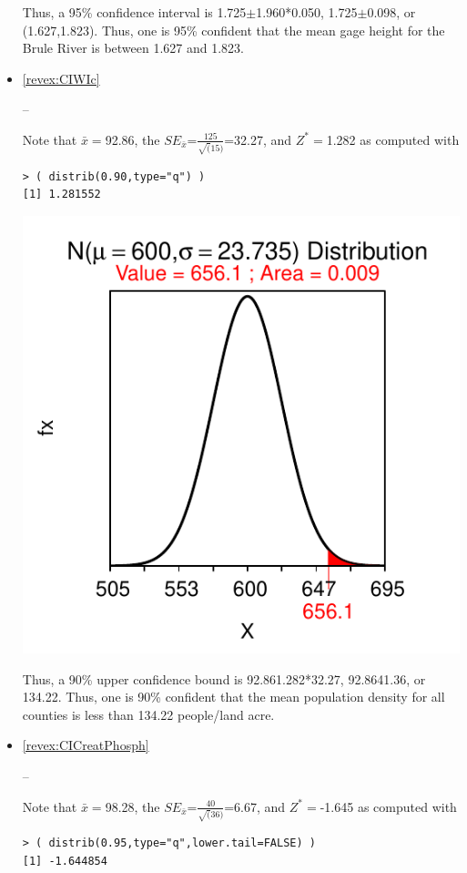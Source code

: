 \documentclass[10pt,openany]{book}\usepackage[]{graphicx}\usepackage[]{color}
\makeatletter
\newenvironment{kframe}{%
 \def\at@end@of@kframe{}%
 \ifinner\ifhmode%
  \def\at@end@of@kframe{\end{minipage}}%
  \begin{minipage}{\columnwidth}%
 \fi\fi%
 \def\FrameCommand##1{\hskip\@totalleftmargin \hskip-\fboxsep
 \colorbox{shadecolor}{##1}\hskip-\fboxsep
     \hskip-\linewidth \hskip-\@totalleftmargin \hskip\columnwidth}%
 \MakeFramed {\advance\hsize-\width
   \@totalleftmargin\z@ \linewidth\hsize
   \@setminipage}}%
 {\par\unskip\endMakeFramed%
 \at@end@of@kframe}
\newenvironment{knitrout}{}{} %
\makeatother
\begin{document}
\begin{itemize}
\begin{knitrout}
{}



\end{knitrout}
Thus, a 95\% confidence interval is 1.725$\pm$1.960*0.050, 1.725$\pm$0.098, or (1.627,1.823).  Thus, one is 95\% confident that the mean gage height for the Brule River is between 1.627 and 1.823.
  \item \hypertarget{ans:CIWIc}{\ref{revex:CIWIc}} --

Note that $\bar{x}=$92.86, the $SE_{\bar{x}}$=$\frac{125}{\sqrt(15)}$=32.27, and $Z^{*}=$1.282 as computed with
\begin{knitrout}
\color{fgcolor}\begin{kframe}
\begin{verbatim}
> ( distrib(0.90,type="q") )
[1] 1.281552
\end{verbatim}
\end{kframe}

{\centering \includegraphics[width=.4\linewidth]{Figs/unnamed-chunk-348-1} 

}



\end{knitrout}
Thus, a 90\% upper confidence bound is 92.861.282*32.27, 92.8641.36, or 134.22.  Thus, one is 90\% confident that the mean population density for all counties is less than 134.22 people/land acre.
  \item \hypertarget{ans:CICreatPhosph}{\ref{revex:CICreatPhosph}} --

Note that $\bar{x}=$98.28, the $SE_{\bar{x}}$=$\frac{40}{\sqrt(36)}$=6.67, and $Z^{*}=$-1.645 as computed with
\begin{knitrout}
\color{fgcolor}\begin{kframe}
\begin{verbatim}
> ( distrib(0.95,type="q",lower.tail=FALSE) )
[1] -1.644854
\end{verbatim}
\end{kframe}


\end{knitrout}
\end{itemize}
\end{document}
